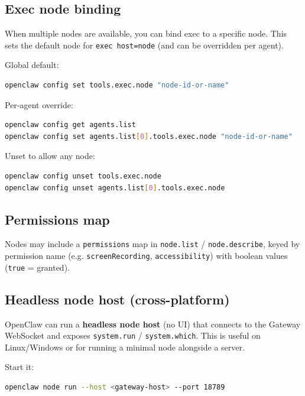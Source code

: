 \subsection{Exec node binding}


When multiple nodes are available, you can bind exec to a specific node.
This sets the default node for \texttt{exec host=node} (and can be overridden per agent).

Global default:

\begin{lstlisting}[language=bash]
openclaw config set tools.exec.node "node-id-or-name"
\end{lstlisting}


Per-agent override:

\begin{lstlisting}[language=bash]
openclaw config get agents.list
openclaw config set agents.list[0].tools.exec.node "node-id-or-name"
\end{lstlisting}


Unset to allow any node:

\begin{lstlisting}[language=bash]
openclaw config unset tools.exec.node
openclaw config unset agents.list[0].tools.exec.node
\end{lstlisting}


\subsection{Permissions map}


Nodes may include a \texttt{permissions} map in \texttt{node.list} / \texttt{node.describe}, keyed by permission name (e.g. \texttt{screenRecording}, \texttt{accessibility}) with boolean values (\texttt{true} = granted).

\subsection{Headless node host (cross-platform)}


OpenClaw can run a \textbf{headless node host} (no UI) that connects to the Gateway
WebSocket and exposes \texttt{system.run} / \texttt{system.which}. This is useful on Linux/Windows
or for running a minimal node alongside a server.

Start it:

\begin{lstlisting}[language=bash]
openclaw node run --host <gateway-host> --port 18789
\end{lstlisting}


